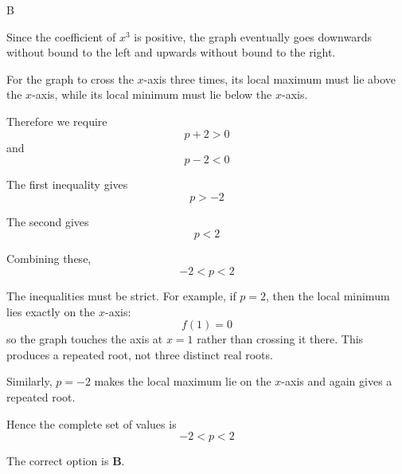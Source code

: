 \documentclass[11pt,a4paper]{article}
\begin{document}
\begin{enumerate}[label=\textbf{\arabic*.},leftmargin=*,itemsep=0pt,start=20]
\begin{djsSolution}{B}
\begin{djsSolutionFigure}
\end{djsSolutionFigure}

Since the coefficient of \(x^3\) is positive, the graph eventually goes downwards without bound to the left and upwards without bound to the right.

For the graph to cross the \(x\)-axis three times, its local maximum must lie above the \(x\)-axis, while its local minimum must lie below the \(x\)-axis.

Therefore we require
\[
p+2>0
\]
and
\[
p-2<0
\]

The first inequality gives
\[
p>-2
\]

The second gives
\[
p<2
\]

Combining these,
\[
-2<p<2
\]

The inequalities must be strict. For example, if \(p=2\), then the local minimum lies exactly on the \(x\)-axis:
\[
f(1)=0
\]
so the graph touches the axis at \(x=1\) rather than crossing it there. This produces a repeated root, not three distinct real roots.

Similarly, \(p=-2\) makes the local maximum lie on the \(x\)-axis and again gives a repeated root.

Hence the complete set of values is
\[
-2<p<2
\]

The correct option is \textbf{B}.
\end{djsSolution}
\end{enumerate}
\end{document}
